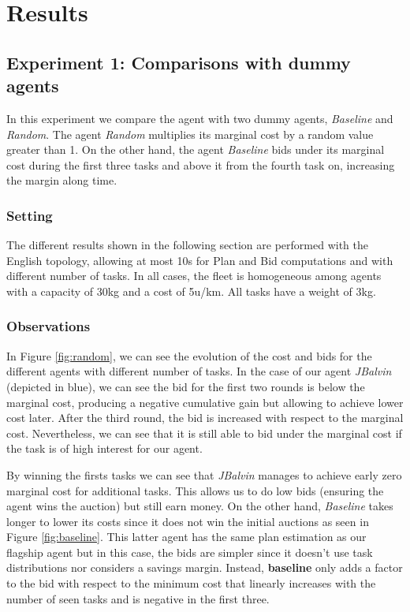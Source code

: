 \documentclass[11pt]{article}
\begin{document}
\section{Results}

\subsection{Experiment 1: Comparisons with dummy agents}
In this experiment we compare the agent with two dummy agents, \textit{Baseline} and \textit{Random}. The agent \textit{Random} multiplies its marginal cost by a random value greater than 1. On the other hand, the agent \textit{Baseline} bids under its marginal cost during the first three tasks and above it from the fourth task on, increasing the margin along time. 


\subsubsection{Setting}
The different results shown in the following section are performed with the English topology, allowing at most 10s for Plan and Bid computations and with different number of tasks. In all cases, the fleet is homogeneous among agents with a capacity of 30kg and a cost of 5u/km. All tasks have a weight of 3kg. 

\subsubsection{Observations}
In Figure \ref{fig:random}, we can see the evolution of the cost and bids for the different agents with different number of tasks. In the case of our agent \textit{JBalvin} (depicted in blue), we can see the bid for the first two rounds is below the marginal cost, producing a negative cumulative gain but allowing to achieve lower cost later. After the third round, the bid is increased with respect to the marginal cost. Nevertheless, we can see that it is still able to bid under the marginal cost if the task is of high interest for our agent.

By winning the firsts tasks we can see that \textit{JBalvin} manages to achieve early zero marginal cost for additional tasks. This allows us to do low bids (ensuring the agent wins the auction) but still earn money. On the other hand, \textit{Baseline} takes longer to lower its costs since it does not win the initial auctions as seen in Figure \ref{fig:baseline}. This latter agent has the same plan estimation as our flagship agent but in this case, the bids are simpler since it doesn't use task distributions nor considers a savings margin. Instead, \textbf{baseline} only adds a factor to the bid with respect to the minimum cost that linearly increases with the number of seen tasks and is negative in the first three.
\end{document}
